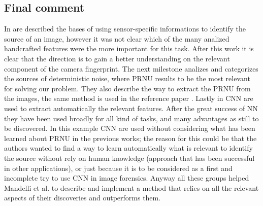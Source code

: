 \subsection{Final comment}
In \cite{Kharrazi} are described the bases of using sensor-specific informations to identify 
the source of an image, however it was not clear which of the many analized handcrafted features were the more important for this task.
After this work it is clear that the direction is to gain a better understanding on the relevant component of the camera fingerprint.\newline
The next milestone \cite{Lukas} analizes and categorizes the sources of deterministic noise, where PRNU results to be the most relevant for solving our problem.
They also describe the way to extract the PRNU from the images, the same method is used in the reference paper \cite{Mandelli}.
Lastly in \cite{Bondi} CNN are used to extract automatically the relevant features. After the great success of NN they have been used broadly for all kind of tasks,
and many advantages as still to be discovered. In this example CNN are used without considering what has been learned about PRNU in the previous works; 
the reason for this could be that the authors wanted to find a way to learn automatically what is relevant to identify the source without rely on human knowledge (approach that has been successful in other applications),
or just because it is to be considered as a first and incomplete try to use CNN in image forensics.
Anyway all these groups helped Mandelli et al. \cite{Mandelli} to describe and implement a method that relies on all the relevant aspects of their discoveries and outperforms them.